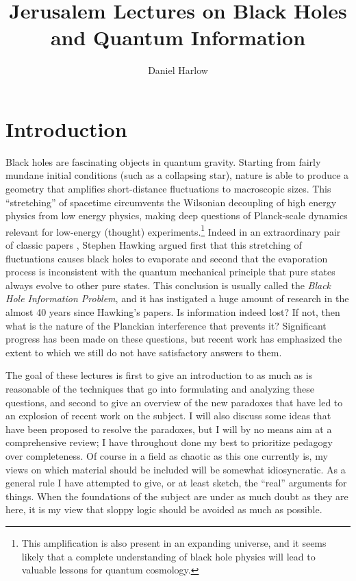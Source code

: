 \documentclass[12pt]{article}
\begin{document}
\title{Jerusalem Lectures on Black Holes and Quantum Information}
\author[a]{Daniel Harlow}

\maketitle
\section{Introduction}
Black holes are fascinating objects in quantum gravity.  Starting from fairly mundane initial conditions (such as a collapsing star), nature is able to produce a geometry that amplifies short-distance fluctuations to macroscopic sizes.  This ``stretching'' of spacetime circumvents the Wilsonian decoupling of high energy physics from low energy physics, making deep questions of Planck-scale dynamics  relevant for low-energy (thought) experiments.\footnote{This amplification is also present in an expanding universe, and it seems likely that a complete understanding of black hole physics will lead to valuable lessons for quantum cosmology.}  Indeed in an extraordinary pair of classic papers \cite{Hawking:1974sw,Hawking:1976ra}, Stephen Hawking argued first that this stretching of fluctuations causes black holes to evaporate and second that the evaporation process is inconsistent with the quantum mechanical principle that pure states always evolve to other pure states.  This conclusion is usually called the \textit{Black Hole Information Problem}, and it has instigated a huge amount of research in the almost 40 years since Hawking's papers.  Is information indeed lost?  If not, then what is the nature of the Planckian interference that prevents it?  Significant progress has been made on these questions, but recent work has emphasized the extent to which we still do not have satisfactory answers to them.  

The goal of these lectures is first to give an introduction to as much as is reasonable of the techniques that go into formulating and analyzing these questions, and second to give an overview of the new paradoxes that have led to an explosion of recent work on the subject.  I will also discuss some ideas that have been proposed to resolve the paradoxes, but I will by no means aim at a comprehensive review; I have throughout done my best to prioritize pedagogy over completeness.  Of course in a field as chaotic as this one currently is, my views on which material should be included will be somewhat idiosyncratic.  As a general rule I have attempted to give, or at least sketch, the ``real'' arguments for things.  When the foundations of the subject are under as much doubt as they are here, it is my view that sloppy logic should be avoided as much as possible.
\end{document}
